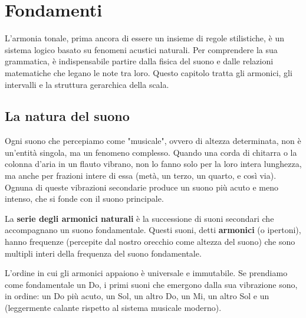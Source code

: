 \chapter{Fondamenti}
\label{chap:fondamenti}

L'armonia tonale, prima ancora di essere un insieme di regole stilistiche, è un sistema logico basato su fenomeni acustici naturali. Per comprendere la sua grammatica, è indispensabile partire dalla fisica del suono e dalle relazioni matematiche che legano le note tra loro. Questo capitolo tratta gli armonici, gli intervalli e la struttura gerarchica della scala.

\section{La natura del suono}
\label{sec:natura_suono}

Ogni suono che percepiamo come "musicale", ovvero di altezza determinata, non è un'entità singola, ma un fenomeno complesso. Quando una corda di chitarra o la colonna d'aria in un flauto vibrano, non lo fanno solo per la loro intera lunghezza, ma anche per frazioni intere di essa (metà, un terzo, un quarto, e così via). Ognuna di queste vibrazioni secondarie produce un suono più acuto e meno intenso, che si fonde con il suono principale.

\begin{definizione}
	\label{def:serie_armonici}
	La \textbf{serie degli armonici naturali} è la successione di suoni secondari che accompagnano un suono fondamentale. Questi suoni, detti \textbf{armonici} (o ipertoni), hanno frequenze (percepite dal nostro orecchio come altezza del suono) che sono multipli interi della frequenza del suono fondamentale.
\end{definizione}

L'ordine in cui gli armonici appaiono è universale e immutabile. Se prendiamo come fondamentale un Do, i primi suoni che emergono dalla sua vibrazione sono, in ordine: un Do più acuto, un Sol, un altro Do, un Mi, un altro Sol e un \Sibemolle  (leggermente calante rispetto al sistema musicale moderno).

\begin{esempio}
	\label{ex:serie_armonici_do}
\end{esempio}

